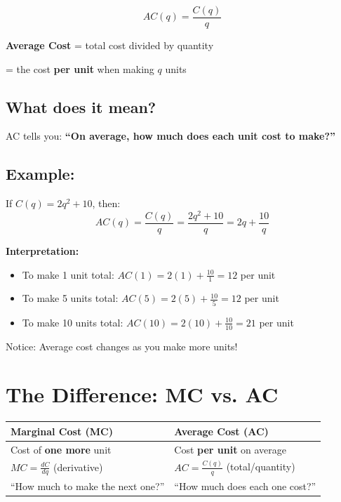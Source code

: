 \documentclass[11pt]{article}
\begin{document}
\begin{tcolorbox}[colback=boxgreen, colframe=green!50!black, title=Definition:]
\Large
\[
AC(q) = \frac{C(q)}{q}
\]

\normalsize
\textbf{Average Cost} = total cost divided by quantity

= the cost \textbf{per unit} when making $q$ units
\end{tcolorbox}

\subsection*{What does it mean?}

AC tells you: \textbf{``On average, how much does each unit cost to make?''}

\subsection*{Example:}

If $C(q) = 2q^2 + 10$, then:
\[
AC(q) = \frac{C(q)}{q} = \frac{2q^2 + 10}{q} = 2q + \frac{10}{q}
\]

\textbf{Interpretation:}
\begin{itemize}[leftmargin=*]
    \item To make 1 unit total: $AC(1) = 2(1) + \frac{10}{1} = 12$ per unit
    \item To make 5 units total: $AC(5) = 2(5) + \frac{10}{5} = 12$ per unit
    \item To make 10 units total: $AC(10) = 2(10) + \frac{10}{10} = 21$ per unit
\end{itemize}

Notice: Average cost changes as you make more units!

\section{The Difference: MC vs. AC}

\begin{center}
\begin{tabular}{p{7cm}|p{7cm}}
\hline
\textbf{Marginal Cost (MC)} & \textbf{Average Cost (AC)} \\
\hline
Cost of \textbf{one more} unit & Cost \textbf{per unit} on average \\[0.3cm]
$MC = \frac{dC}{dq}$ (derivative) & $AC = \frac{C(q)}{q}$ (total/quantity) \\[0.3cm]
``How much to make the next one?'' & ``How much does each one cost?'' \\
\hline
\end{tabular}
\end{center}
\end{document}
